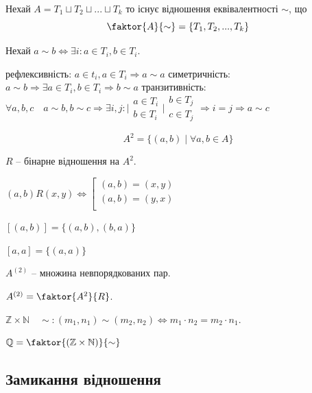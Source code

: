 \begin{theorem}
    Нехай $A = T_1 \sqcup T_2 \sqcup ... \sqcup T_k$
    то існує відношення еквівалентності $\sim$, що
    $$\faktor{A}{\sim} = \{ T_1, T_2, ..., T_k \}$$
\end{theorem}
\begin{definition}
    Нехай $a \sim b \Leftrightarrow \exists i: a \in T_i, b \in T_i$.
    
    рефлексивність: $a \in t_i, a \in T_i \Rightarrow a \sim a$
    симетричність: $a \sim b \Rightarrow \exists a \in T_i, b \in T_i \Rightarrow b \sim a$
    транзитивність: $\forall a, b, c \quad a \sim b, b \sim c \Rightarrow \exists i, j:
        \Big| \begin{array}{l}
            a \in T_i  \\
            b \in T_i
        \end{array} \Big| \begin{array}{l}
            b \in T_j  \\
            c \in T_j
        \end{array} \Rightarrow i = j \Rightarrow a \sim c$
\end{definition}

\begin{example}
    $$A^2 = \{ (a, b) \mid \forall a, b \in A \}$$

    $R$ -- бінарне відношення на $A^2$.

    $(a, b) R (x, y) \Leftrightarrow \left[ \begin{array}{l}
        (a, b) = (x, y) \\
        (a, b) = (y, x) \\
    \end{array} \right.$

    $[(a, b)] = \{(a, b), (b, a)\}$

    $[a, a] = \{(a, a)\}$

    $A^{(2)}$ -- множина невпорядкованих пар.

    $A^{(2)} = \faktor{A^2}{R}$.
\end{example}

\begin{example}
    $\mathbb{Z} \times \mathbb{N} \quad \sim: (m_1, n_1) \sim (m_2, n_2) \Leftrightarrow m_1 \cdot n_2 = m_2 \cdot n_1$.

    $\mathbb{Q} = \faktor{(\mathbb{Z} \times \mathbb{N})}{\sim}$
\end{example}

\subsection{Замикання відношення}

